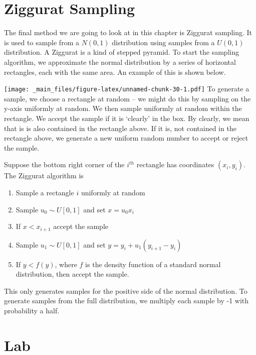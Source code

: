 \documentclass[
]{book}
\providecommand{\tightlist}{%
  \setlength{\itemsep}{0pt}\setlength{\parskip}{0pt}}
\theoremstyle{definition}
\theoremstyle{definition}
\theoremstyle{definition}
\theoremstyle{definition}
\theoremstyle{remark}
\begin{document}
\hypertarget{ziggurat-sampling}{%
\section{Ziggurat Sampling}\label{ziggurat-sampling}}

The final method we are going to look at in this chapter is Ziggurat sampling. It is used to sample from a \(N(0, 1)\) distribution using samples from a \(U(0, 1)\) distribution. A Ziggurat is a kind of stepped pyramid. To start the sampling algorithm, we approximate the normal distribution by a series of horizontal rectangles, each with the same area. An example of this is shown below.

\texttt{[image: \_main\_files/figure-latex/unnamed-chunk-30-1.pdf]}
To generate a sample, we choose a rectangle at random -- we might do this by sampling on the y-axis uniformly at random. We then sample uniformly at random within the rectangle. We accept the sample if it is `clearly' in the box. By clearly, we mean that is is also contained in the rectangle above. If it is, not contained in the rectangle above, we generate a new uniform random number to accept or reject the sample.

Suppose the bottom right corner of the \(i^{th}\) rectangle has coordinates \((x_i, y_i)\). The Ziggurat algorithm is

\begin{enumerate}
\def\labelenumi{\arabic{enumi}.}
\tightlist
\item
  Sample a rectangle \(i\) uniformly at random
\item
  Sample \(u_0 \sim U[0, 1]\) and set \(x = u_0x_i\)
\item
  If \(x < x_{i+1}\) accept the sample
\item
  Sample \(u_1 \sim U[0, 1]\) and set \(y = y_i + u_1(y_{i+1} − y_i)\)
\item
  If \(y < f(y)\), where \(f\) is the density function of a standard normal distribution, then accept the sample.
\end{enumerate}

This only generates samples for the positive side of the normal distribution. To generate samples from the full distribution, we multiply each sample by -1 with probability a half.

\hypertarget{lab-1}{%
\section{Lab}\label{lab-1}}
\end{document}
